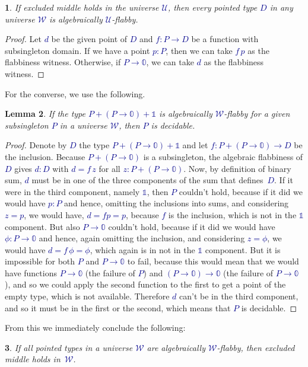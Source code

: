 \documentclass[10pt]{article}
\newcommand{\db}{\textcolor{darkblue}}
\newcommand{\m}[1]{\db{$#1$}}
\newcommand{\U}{\mathcal{U}}
\newcommand{\W}{\mathcal{W}}
\newcommand{\Zero}{\mathbb{0}}
\newcommand{\One}{\mathbb{1}}
\newtheorem{numbered}{}
\newtheorem{lemma}[numbered]{Lemma}
\theoremstyle{definition}
\begin{document}
\begin{numbered}
  If excluded middle holds in the universe \m{\U}, then every pointed
  type \m{D} in any universe \m{\W} is algebraically \m{\U}-flabby.
\end{numbered}
\begin{proof}
  Let \m{d} be the given point of \m{D} and \m{f : P \to D} be a function with
  subsingleton domain. If we have a point \m{p : P}, then we can take
  \m{f \, p} as the flabbiness witness. Otherwise, if \m{P \to \Zero},
  we can take \m{d} as the flabbiness witness.
\end{proof}
\noindent
For the converse, we use the following.
\begin{lemma}
  If the type \m{P + (P \to \Zero) + \One} is algebraically
  \m{\W}-flabby for a given subsingleton \m{P} in a universe \m{\W},
  then \m{P} is decidable.
\end{lemma}
\begin{proof}
  Denote by \m{D} the type \m{P + (P \to \Zero) + \One} and let \m{f :
    P + (P \to \Zero) \to D} be the inclusion. Because \m{P + (P \to
    \Zero)} is a subsingleton, the algebraic flabbiness of \m{D} gives
  \m{d : D} with \m{d = f \, z} for all \m{z : P + (P \to \Zero)}.
  Now, by definition of binary sum, \m{d} must be in one of the three
  components of the sum that defines~\m{D}.  If it were in the third
  component, namely \m{\One}, then \m{P} couldn't hold, because if it
  did we would have \m{p:P} and hence, omitting the inclusions into
  sums, and considering \m{z=p}, we would have, \m{d = f p = p},
  because \m{f} is the inclusion, which is not in the \m{\One}
  component. But also \m{P \to \Zero} couldn't hold, because if it did
  we would have \m{\phi:P \to \Zero} and hence, again omitting the
  inclusion, and considering \m{z=\phi}, we would have \m{d = f \,
    \phi = \phi}, which again is in not in the \m{\One} component. But
  it is impossible for both \m{P} and \m{P \to \Zero} to fail, because
  this would mean that we would have functions \m{P \to \Zero} (the
  failure of \m{P}) and \m{(P \to \Zero) \to \Zero} (the failure of
  \m{P \to \Zero}), and so we could apply the second function to the
  first to get a point of the empty type, which is not
  available. Therefore \m{d} can't be in the third component, and so
  it must be in the first or the second, which means that \m{P} is
  decidable.
\end{proof}
\noindent From this we immediately conclude the following:
\begin{numbered}
  If all pointed types in a universe \m{\W} are algebraically \m{\W}-flabby, then excluded middle holds in~\m{\W}.
\end{numbered}
\end{document}
